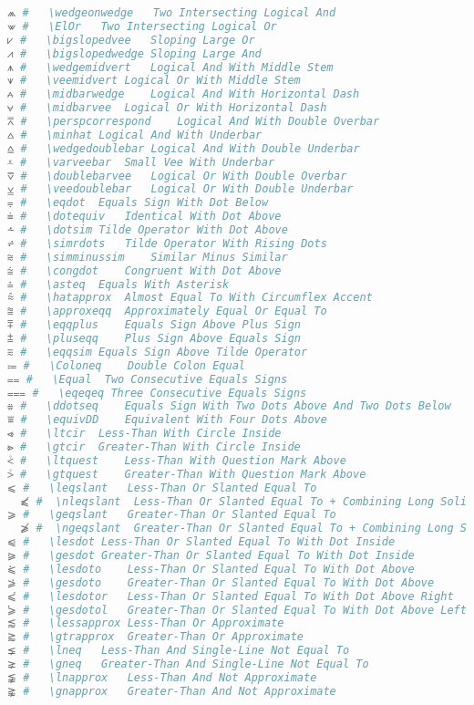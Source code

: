 \begin{lstlisting}[language=Julia, linewidth=\textwidth]
⩕ #   \wedgeonwedge   Two Intersecting Logical And
⩖ #   \ElOr   Two Intersecting Logical Or
⩗ #   \bigslopedvee   Sloping Large Or
⩘ #   \bigslopedwedge Sloping Large And
⩚ #   \wedgemidvert   Logical And With Middle Stem
⩛ #   \veemidvert Logical Or With Middle Stem
⩜ #   \midbarwedge    Logical And With Horizontal Dash
⩝ #   \midbarvee  Logical Or With Horizontal Dash
⩞ #   \perspcorrespond    Logical And With Double Overbar
⩟ #   \minhat Logical And With Underbar
⩠ #   \wedgedoublebar Logical And With Double Underbar
⩡ #   \varveebar  Small Vee With Underbar
⩢ #   \doublebarvee   Logical Or With Double Overbar
⩣ #   \veedoublebar   Logical Or With Double Underbar
⩦ #   \eqdot  Equals Sign With Dot Below
⩧ #   \dotequiv   Identical With Dot Above
⩪ #   \dotsim Tilde Operator With Dot Above
⩫ #   \simrdots   Tilde Operator With Rising Dots
⩬ #   \simminussim    Similar Minus Similar
⩭ #   \congdot    Congruent With Dot Above
⩮ #   \asteq  Equals With Asterisk
⩯ #   \hatapprox  Almost Equal To With Circumflex Accent
⩰ #   \approxeqq  Approximately Equal Or Equal To
⩱ #   \eqqplus    Equals Sign Above Plus Sign
⩲ #   \pluseqq    Plus Sign Above Equals Sign
⩳ #   \eqqsim Equals Sign Above Tilde Operator
⩴ #   \Coloneq    Double Colon Equal
⩵ #   \Equal  Two Consecutive Equals Signs
⩶ #   \eqeqeq Three Consecutive Equals Signs
⩷ #   \ddotseq    Equals Sign With Two Dots Above And Two Dots Below
⩸ #   \equivDD    Equivalent With Four Dots Above
⩹ #   \ltcir  Less-Than With Circle Inside
⩺ #   \gtcir  Greater-Than With Circle Inside
⩻ #   \ltquest    Less-Than With Question Mark Above
⩼ #   \gtquest    Greater-Than With Question Mark Above
⩽ #   \leqslant   Less-Than Or Slanted Equal To
  ⩽̸ #  \nleqslant  Less-Than Or Slanted Equal To + Combining Long Solidus Overlay
⩾ #   \geqslant   Greater-Than Or Slanted Equal To
  ⩾̸ #  \ngeqslant  Greater-Than Or Slanted Equal To + Combining Long Solidus Overlay
⩿ #   \lesdot Less-Than Or Slanted Equal To With Dot Inside
⪀ #   \gesdot Greater-Than Or Slanted Equal To With Dot Inside
⪁ #   \lesdoto    Less-Than Or Slanted Equal To With Dot Above
⪂ #   \gesdoto    Greater-Than Or Slanted Equal To With Dot Above
⪃ #   \lesdotor   Less-Than Or Slanted Equal To With Dot Above Right
⪄ #   \gesdotol   Greater-Than Or Slanted Equal To With Dot Above Left
⪅ #   \lessapprox Less-Than Or Approximate
⪆ #   \gtrapprox  Greater-Than Or Approximate
⪇ #   \lneq   Less-Than And Single-Line Not Equal To
⪈ #   \gneq   Greater-Than And Single-Line Not Equal To
⪉ #   \lnapprox   Less-Than And Not Approximate
⪊ #   \gnapprox   Greater-Than And Not Approximate

\end{lstlisting}
